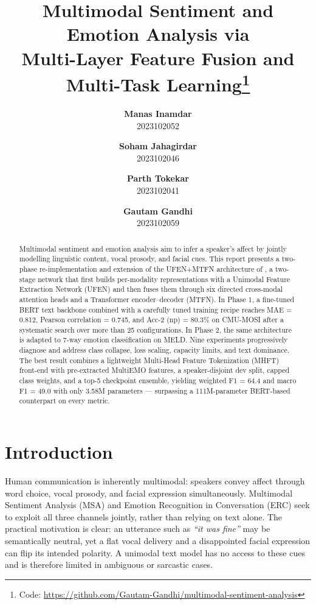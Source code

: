 \documentclass[11pt,twocolumn]{article}
\title{\Large\bf Multimodal Sentiment and Emotion Analysis via\\[2pt]
Multi-Layer Feature Fusion and Multi-Task Learning\thanks{Code:
\url{https://github.com/Gautam-Gandhi/multimodal-sentiment-analysis}}}
\author{
  \textbf{Manas Inamdar} \\
  2023102052
  \and
  \textbf{Soham Jahagirdar} \\
  2023102046
  \and
  \textbf{Parth Tokekar} \\
  2023102041
  \and
  \textbf{Gautam Gandhi} \\
  2023102059
}
\date{}
\begin{document}
\maketitle

\begin{abstract}
Multimodal sentiment and emotion analysis aim to infer a speaker's affect by jointly modelling linguistic content, vocal prosody, and facial cues. This report presents a two-phase re-implementation and extension of the UFEN+MTFN architecture of \citet{cai2025multimodal}, a two-stage network that first builds per-modality representations with a Unimodal Feature Extraction Network (UFEN) and then fuses them through six directed cross-modal attention heads and a Transformer encoder--decoder (MTFN). In Phase 1, a fine-tuned BERT text backbone combined with a carefully tuned training recipe reaches MAE = 0.812, Pearson correlation = 0.745, and Acc-2 (np) = 80.3\% on CMU-MOSI after a systematic search over more than 25 configurations. In Phase 2, the same architecture is adapted to 7-way emotion classification on MELD. Nine experiments progressively diagnose and address class collapse, loss scaling, capacity limits, and text dominance. The best result combines a lightweight Multi-Head Feature Tokenization (MHFT) front-end with pre-extracted MultiEMO features, a speaker-disjoint dev split, capped class weights, and a top-5 checkpoint ensemble, yielding weighted F1 = 64.4 and macro F1 = 49.0 with only 3.58M parameters --- surpassing a 111M-parameter BERT-based counterpart on every metric.
\end{abstract}

\section{Introduction}
\label{sec:intro}

Human communication is inherently multimodal: speakers convey affect through word choice, vocal prosody, and facial expression simultaneously. Multimodal Sentiment Analysis (MSA) and Emotion Recognition in Conversation (ERC) seek to exploit all three channels jointly, rather than relying on text alone. The practical motivation is clear: an utterance such as \emph{``it was fine''} may be semantically neutral, yet a flat vocal delivery and a disappointed facial expression can flip its intended polarity. A unimodal text model has no access to these cues and is therefore limited in ambiguous or sarcastic cases.
\end{document}
